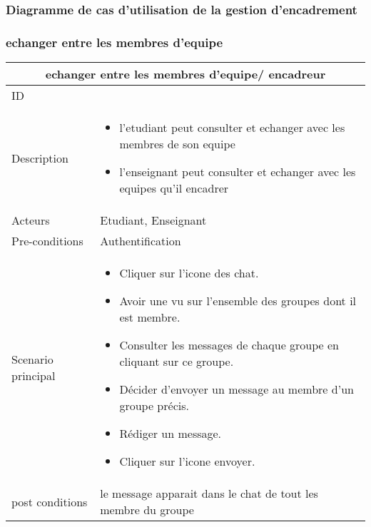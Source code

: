 \documentclass[11pt,fleqn]{book} %
\begin{document}
\subsubsection{Diagramme de cas d’utilisation de la gestion 
d'encadrement}

\subsubsection{echanger entre les membres d'equipe}
\begin{center}
\begin{tabularx}{1\textwidth} { | p{4cm} | >{\raggedright\arraybackslash}X |  }
  \hline
  \multicolumn{2}{|c|}{echanger entre les membres d'equipe/ encadreur} \\
 \hline
 ID & 1  \\
 \hline
 Description  &   \begin{itemize}
     \item l'etudiant peut consulter et echanger avec les membres de son equipe
     \item l'enseignant peut consulter et echanger avec les equipes qu'il encadrer
 \end{itemize}
 \\
  \hline
 Acteurs  & Etudiant, Enseignant   \\
  \hline
 Pre-conditions  & Authentification\\
 \hline
 Scenario principal  &  
 \begin{itemize}
     \item Cliquer sur l’icone des chat.
     \item Avoir une vu sur l’ensemble des groupes dont il est membre.
     \item Consulter les messages de chaque groupe en cliquant sur ce groupe.
     \item Décider d’envoyer un message au membre d’un groupe précis.
     \item Rédiger un message.
     \item Cliquer sur l’icone envoyer.
 \end{itemize}\\
  \hline
 post conditions  & le message apparait dans le chat de tout les membre du groupe  \\
  \hline
\end{tabularx}
\label{tbl:nicetablelesstable}
\end{center}

\end{document}

